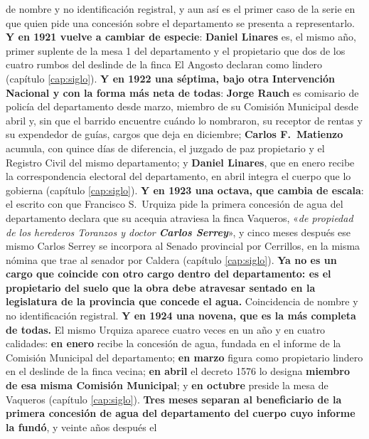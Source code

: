 de nombre y no identificación registral, y aun así es el primer caso de la serie en que quien
pide una concesión sobre el departamento se presenta a representarlo. \textbf{Y en 1921 vuelve a
cambiar de especie}: \textbf{Daniel Linares} es, el mismo año, primer
suplente de la mesa 1 del departamento y el propietario que dos de los cuatro rumbos del deslinde
de la finca El Angosto declaran como lindero (capítulo \ref{cap:siglo}). \textbf{Y en 1922 una séptima, bajo otra Intervención Nacional y con la forma más neta de
todas}: \textbf{Jorge Rauch} es comisario de policía del departamento desde marzo, miembro de su
Comisión Municipal desde abril y, sin que el barrido encuentre cuándo lo nombraron, su receptor de
rentas y su expendedor de guías, cargos que deja en diciembre; \textbf{Carlos F.\ Matienzo} acumula, con quince días de
diferencia, el juzgado de paz propietario y el Registro Civil del mismo departamento; y
\textbf{Daniel Linares}, que en enero recibe la correspondencia electoral del departamento, en
abril integra el cuerpo que lo gobierna (capítulo \ref{cap:siglo}). \textbf{Y en 1923 una octava, que cambia de escala}: el escrito con que
Francisco S.\ Urquiza pide la primera concesión de agua del
departamento declara que su acequia atraviesa la finca Vaqueros, «\textit{de propiedad de los
herederos Toranzos y doctor \textbf{Carlos Serrey}}», y cinco meses después
ese mismo Carlos Serrey se incorpora al Senado provincial por Cerrillos, en la misma nómina que
trae al senador por Caldera (capítulo \ref{cap:siglo}). \textbf{Ya no es un cargo que coincide con
otro cargo dentro del departamento: es el propietario del suelo que la obra debe atravesar
sentado en la legislatura de la provincia que concede el agua.} Coincidencia de nombre y no
identificación registral. \textbf{Y en 1924 una novena, que es la más completa de todas.} El mismo Urquiza
aparece cuatro veces en un año y en cuatro calidades: \textbf{en enero} recibe la concesión de
agua, fundada en el informe de la Comisión Municipal del departamento; \textbf{en marzo} figura
como propietario lindero en el deslinde de la finca vecina; \textbf{en abril} el decreto 1576 lo
designa \textbf{miembro de esa misma Comisión Municipal}; y \textbf{en octubre} preside la mesa de
Vaqueros (capítulo \ref{cap:siglo}). \textbf{Tres meses separan al beneficiario de la primera
concesión de agua del departamento del cuerpo cuyo informe la fundó}, y veinte años después el

